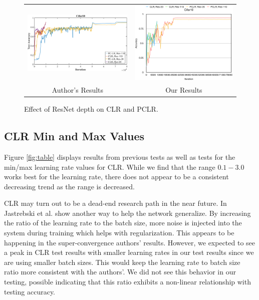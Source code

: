 \documentclass[10pt,twocolumn,letterpaper]{article}
\begin{document}
\begin{figure}[ht!]
    \begin{tabular}{cc}
        \includegraphics[trim=0 0 0 0, clip,
            width=3.25in]{images/figure_6b.png} &
        \includegraphics[trim=0 0 0 0, clip,
            width=3.25in]{images/resnet_sizes.png} \\
        Author's Results & Our Results \\
    \end{tabular}
    \caption{Effect of ResNet depth on CLR and PCLR.}
    \label{fig:resnet_sizes}
\end{figure}

\subsection{CLR Min and Max Values}
Figure \ref{fig:table} displays results from previous tests as well as tests
for the min/max learning rate values for CLR. While we find that the range
$0.1-3.0$ works best for the learning rate, there does not appear to be a
consistent decreasing trend as the range is decreased.

CLR may turn out to be a dead-end research path in the near future. In
\cite{SGD_Minima} Jastrebski et al. show another way to help the network
generalize. By increasing the ratio of the learning rate to the batch size,
more noise is injected into the system during training which helps with
regularization. This appears to be happening in the super-convergence authors'
results. However, we expected to see a peak in CLR test results with smaller
learning rates in our test results since we are using smaller batch sizes. This
would keep the learning rate to batch size ratio more consistent with the
authors'. We did not see this behavior in our testing, possible indicating that
this ratio exhibits a non-linear relationship with testing accuracy.
\end{document}
